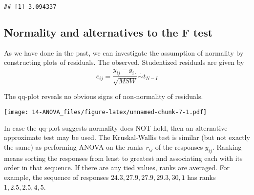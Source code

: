 \documentclass[
]{book}
\newenvironment{Shaded}{\begin{snugshade}}{\end{snugshade}}
\newcommand{\AttributeTok}[1]{\textcolor[rgb]{0.77,0.63,0.00}{#1}}
\newcommand{\ControlFlowTok}[1]{\textcolor[rgb]{0.13,0.29,0.53}{\textbf{#1}}}
\newcommand{\DecValTok}[1]{\textcolor[rgb]{0.00,0.00,0.81}{#1}}
\newcommand{\FloatTok}[1]{\textcolor[rgb]{0.00,0.00,0.81}{#1}}
\newcommand{\FunctionTok}[1]{\textcolor[rgb]{0.00,0.00,0.00}{#1}}
\newcommand{\NormalTok}[1]{#1}
\newcommand{\OtherTok}[1]{\textcolor[rgb]{0.56,0.35,0.01}{#1}}
\newcommand{\SpecialCharTok}[1]{\textcolor[rgb]{0.00,0.00,0.00}{#1}}
\begin{document}
\begin{verbatim}
## [1] 3.094337
\end{verbatim}

\hypertarget{normality-and-alternatives-to-the-f-test}{%
\subsection{Normality and alternatives to the F test}\label{normality-and-alternatives-to-the-f-test}}

As we have done in the past, we can investigate the assumption of normality by constructing plots of residuals. The observed, Studentized residuals are given by
\[e_{ij} = \frac{y_{ij} - \bar y_{i\cdot}}{\sqrt{MSW}}\stackrel{\cdot}{\sim} t_{N-I}\]

The qq-plot reveals no obvious signs of non-normality of residuals.

\begin{Shaded}
\end{Shaded}

\texttt{[image: 14-ANOVA\_files/figure-latex/unnamed-chunk-7-1.pdf]}

In case the qq-plot suggests normality does NOT hold, then an alternative approximate test may be used. The Kruskal-Wallis test is similar (but not exactly the same) as performing ANOVA on the ranks \(r_{ij}\) of the responses \(y_{ij}\). Ranking means sorting the responses from least to greatest and associating each with its order in that sequence. If there are any tied values, ranks are averaged. For example, the sequence of responses \(24.3, 27.9, 27.9, 29.3, 30,1\) has ranks \(1, 2.5, 2.5, 4, 5\).
\end{document}
